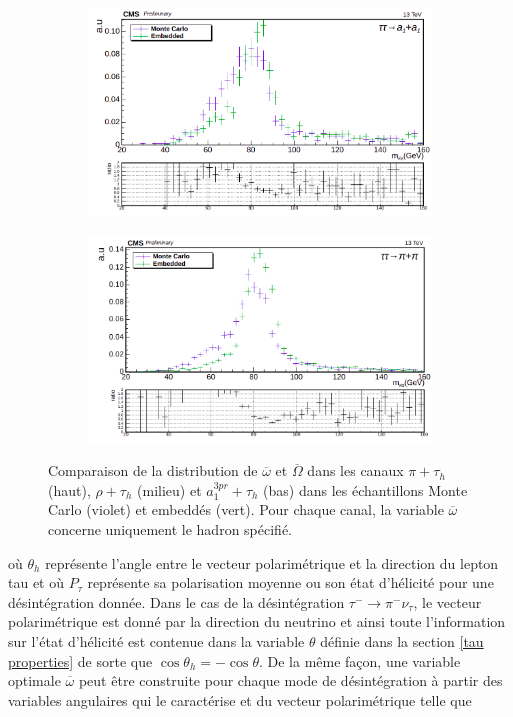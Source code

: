 \begin{figure}[!ht]
    \begin{subfigure}[b]{0.5\linewidth}
    \centering
    \includegraphics[width=\linewidth]{Chapitre6/Images/OptVar/mvis_a1a1.png} 
    \caption*{} 
    \vspace{0.5ex}
  \end{subfigure}%
  \begin{subfigure}[b]{0.5\linewidth}
    \centering
    \includegraphics[width=\linewidth]{Chapitre6/Images/OptVar/mvis_pipi.png} 
    \caption*{} 
    \vspace{0.5ex}
  \end{subfigure}
  \caption{Comparaison de la distribution de $\overline{\omega}$ et $\overline{\Omega}$ dans les canaux $\pi+\tau_h$ (haut), $\rho+\tau_h$ (milieu) et $a_1^{3pr}+\tau_h$ (bas) dans les échantillons Monte Carlo (violet) et embeddés (vert). Pour chaque canal, la variable $\overline{\omega}$ concerne uniquement le hadron spécifié.}
  \label{optvarvis}
\end{figure}

où $\theta_h$ représente l'angle entre le vecteur polarimétrique et la direction du lepton tau et où $P_{\tau}$ représente sa polarisation moyenne ou son état d'hélicité pour une désintégration donnée. Dans le cas de la désintégration $\tau^-\rightarrow\pi^-\nu_{\tau}$, le vecteur polarimétrique est donné par la direction du neutrino et ainsi toute l'information sur l'état d'hélicité est contenue dans la variable $\theta$ définie dans la section \ref{tau properties} de sorte que $\cos\theta_h=-\cos\theta$. De la même façon, une variable optimale $\overline{\omega}$ peut être construite pour chaque mode de désintégration à partir des variables angulaires qui le caractérise et du vecteur polarimétrique telle que 

